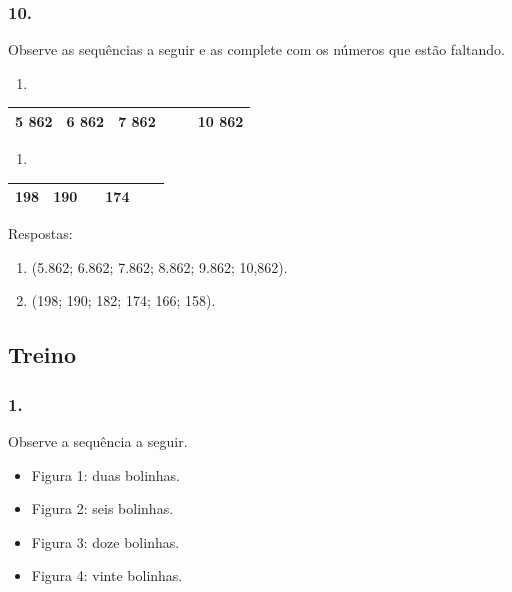 \begin{enumerate}
\begin{escolha}
\begin{enumerate}
\subsubsection{10.}\label{section-35}

Observe as sequências a seguir e as complete com os números que estão
faltando.

\begin{enumerate}
\def\labelenumi{\alph{enumi})}
\item
\end{enumerate}

\begin{longtable}[]{@{}llllll@{}}
\toprule
5 862 & 6 862 & 7 862 &  &  & 10 862\tabularnewline
\bottomrule
\end{longtable}

\begin{enumerate}
\def\labelenumi{\alph{enumi})}
\item
\end{enumerate}

\begin{longtable}[]{@{}llllll@{}}
\toprule
198 & 190 &  & 174 &  & \tabularnewline
\bottomrule
\end{longtable}

Respostas:

\begin{enumerate}
\def\labelenumi{\alph{enumi})}
\item
  (5.862; 6.862; 7.862; 8.862; 9.862; 10,862).
\item
  (198; 190; 182; 174; 166; 158).
\end{enumerate}

\subsection{Treino}\label{treino-2}

\subsubsection{1.}\label{section-36}

Observe a sequência a seguir.

\begin{itemize}
  \item Figura 1: duas bolinhas.
  \item Figura 2: seis bolinhas.
  \item Figura 3: doze bolinhas.
  \item Figura 4: vinte bolinhas.
\end{itemize}


\end{enumerate}
\end{escolha}
\end{enumerate}

